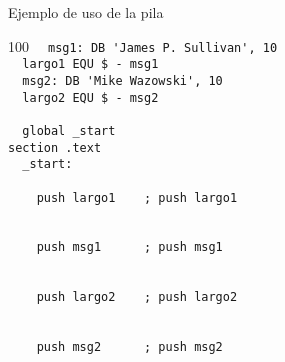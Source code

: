 \documentclass[aspectratio=169]{beamer}
\begin{document}
\begin{frame}[fragile]{Ejemplo de uso de la pila}
\begin{textblock}{100}
    \verb|  msg1: DB 'James P. Sullivan', 10 |\\  
    \verb|  largo1 EQU $ - msg1              |\\
    \verb|  msg2: DB 'Mike Wazowski', 10     |\\
    \verb|  largo2 EQU $ - msg2              |\\
    \verb|                                   |\\
    \verb|  global _start                    |\\
    \verb|section .text                      |\\
    \verb|  _start:                          |\\
    \verb|                                   |\\
    \verb|    push largo1    ; push largo1   |\\
    \verb|                                   |\\
    \verb|                                   |\\
    \verb|    push msg1      ; push msg1     |\\
    \verb|                                   |\\
    \verb|                                   |\\
    \verb|    push largo2    ; push largo2   |\\
    \verb|                                   |\\
    \verb|                                   |\\
    \verb|    push msg2      ; push msg2     |\\
     \end{textblock}
    

\end{frame}
\end{document}
